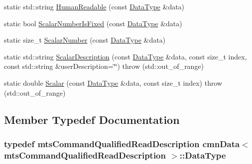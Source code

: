 \begin{DoxyCompactItemize}
\item 
static std\-::string \hyperlink{classcmn_data_3_01mts_command_qualified_read_description_01_4_a018ea56637b945c3af64da15a4bbca0e}{Human\-Readable} (const \hyperlink{classcmn_data_3_01mts_command_qualified_read_description_01_4_a806c74676540892a3a54aed2f6e4d040}{Data\-Type} \&data)
\item 
static bool \hyperlink{classcmn_data_3_01mts_command_qualified_read_description_01_4_ac8acae530d1599e8148c45c05e3c4f99}{Scalar\-Number\-Is\-Fixed} (const \hyperlink{classcmn_data_3_01mts_command_qualified_read_description_01_4_a806c74676540892a3a54aed2f6e4d040}{Data\-Type} \&data)
\item 
static size\-\_\-t \hyperlink{classcmn_data_3_01mts_command_qualified_read_description_01_4_a05cd8d24693bdf3c129ec19a026a8fcd}{Scalar\-Number} (const \hyperlink{classcmn_data_3_01mts_command_qualified_read_description_01_4_a806c74676540892a3a54aed2f6e4d040}{Data\-Type} \&data)
\item 
static std\-::string \hyperlink{classcmn_data_3_01mts_command_qualified_read_description_01_4_a82fe4fcde4e91bf5a6a4c077dd41b9d5}{Scalar\-Description} (const \hyperlink{classcmn_data_3_01mts_command_qualified_read_description_01_4_a806c74676540892a3a54aed2f6e4d040}{Data\-Type} \&data, const size\-\_\-t index, const std\-::string \&user\-Description=\char`\"{}\char`\"{})  throw (std\-::out\-\_\-of\-\_\-range)
\item 
static double \hyperlink{classcmn_data_3_01mts_command_qualified_read_description_01_4_a430b5c608975a70434ee3c564cb0377e}{Scalar} (const \hyperlink{classcmn_data_3_01mts_command_qualified_read_description_01_4_a806c74676540892a3a54aed2f6e4d040}{Data\-Type} \&data, const size\-\_\-t index)  throw (std\-::out\-\_\-of\-\_\-range)
\end{DoxyCompactItemize}


\subsection{Member Typedef Documentation}
\hypertarget{classcmn_data_3_01mts_command_qualified_read_description_01_4_a806c74676540892a3a54aed2f6e4d040}{
\subsubsection[{Data\-Type}]{\setlength{\rightskip}{0pt plus 5cm}typedef {\bf mts\-Command\-Qualified\-Read\-Description} {\bf cmn\-Data}$<$ {\bf mts\-Command\-Qualified\-Read\-Description} $>$\-::{\bf Data\-Type}}}\label{classcmn_data_3_01mts_command_qualified_read_description_01_4_a806c74676540892a3a54aed2f6e4d040}


